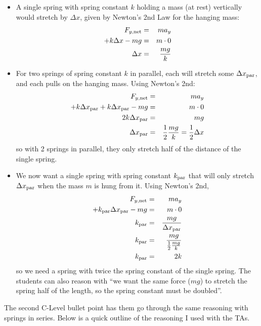 \documentclass[fleqn,letterpaper]{article}
\begin{document}
\begin{itemize}
 \item{A single spring with spring constant $k$ holding a mass (at rest) vertically would stretch by $\Delta x$, given by Newton's 2nd Law for the hanging mass:
 \begin{eqnarray}
  F_{y,{\rm net}} & = & m a_y \\
  +k \Delta x - m g & = & m \cdot 0 \\
  \Delta x & = & \frac{m g}{k}
 \end{eqnarray}}
 \item{For two springs of spring constant $k$ in parallel, each will stretch some $\Delta x_{\rm par}$, and each pulls on the hanging mass.  Using Newton's 2nd:
  \begin{eqnarray}
    F_{y,{\rm net}} & = & m a_y \\
  +k \Delta x_{\rm par} + k \Delta x_{\rm par} - m g & = & m \cdot 0 \\
  2 k \Delta x_{\rm par} & = & mg \\
  \Delta x_{\rm par} & = & \frac{1}{2} \frac{mg}{k} = \frac{1}{2} \Delta x
  \end{eqnarray}
  so with 2 springs in parallel, they only stretch half of the distance of the single spring.
}
 \item{We now want a single spring with spring constant $k_{\rm par}$ that will only stretch $\Delta x_{\rm par}$ when the mass $m$ is hung from it.  Using Newton's 2nd,
  \begin{eqnarray}
    F_{y,{\rm net}} & = & m a_y \\
  +k_{\rm par} \Delta x_{\rm par}  - m g & = & m \cdot 0 \\
  k_{\rm par} & = & \frac{mg}{\Delta x_{\rm par}} \\
  k_{\rm par} & = & \frac{mg}{\frac{1}{2} \frac{mg}{k}} \\
  k_{\rm par} & = & 2 k
  \end{eqnarray}
  so we need a spring with twice the spring constant of the single spring.  The students can also reason with ``we want the same force ($mg$) to stretch the spring half of the length, so the spring constant must be doubled''.
}
\end{itemize}

The second C-Level bullet point has them go through the same reasoning with springs in series.  Below is a quick outline of the reasoning I used with the TAs.
\end{document}
